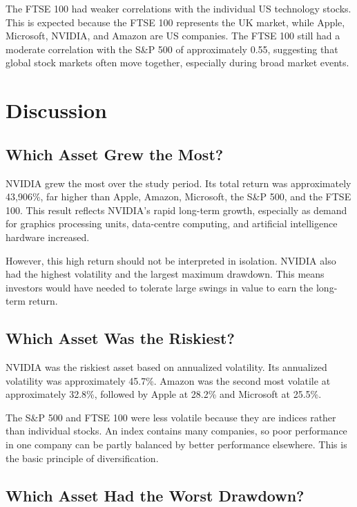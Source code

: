 \documentclass[12pt,a4paper]{article}
\begin{document}
The FTSE 100 had weaker correlations with the individual US technology stocks. This is expected because the FTSE 100 represents the UK market, while Apple, Microsoft, NVIDIA, and Amazon are US companies. The FTSE 100 still had a moderate correlation with the S\&P 500 of approximately 0.55, suggesting that global stock markets often move together, especially during broad market events.

\section{Discussion}

\subsection{Which Asset Grew the Most?}

NVIDIA grew the most over the study period. Its total return was approximately 43,906\%, far higher than Apple, Amazon, Microsoft, the S\&P 500, and the FTSE 100. This result reflects NVIDIA's rapid long-term growth, especially as demand for graphics processing units, data-centre computing, and artificial intelligence hardware increased.

However, this high return should not be interpreted in isolation. NVIDIA also had the highest volatility and the largest maximum drawdown. This means investors would have needed to tolerate large swings in value to earn the long-term return.

\subsection{Which Asset Was the Riskiest?}

NVIDIA was the riskiest asset based on annualized volatility. Its annualized volatility was approximately 45.7\%. Amazon was the second most volatile at approximately 32.8\%, followed by Apple at 28.2\% and Microsoft at 25.5\%.

The S\&P 500 and FTSE 100 were less volatile because they are indices rather than individual stocks. An index contains many companies, so poor performance in one company can be partly balanced by better performance elsewhere. This is the basic principle of diversification.

\subsection{Which Asset Had the Worst Drawdown?}
\end{document}
